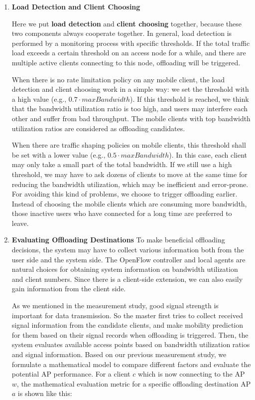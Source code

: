 \documentclass[english]{tktltiki}
\begin{document}
\begin{enumerate}
\item \textbf{Load Detection and Client Choosing}

Here we put \textbf{load detection} and \textbf{client choosing} together, because these two components always cooperate together. In general, load detection is performed by a monitoring process with specific thresholds. If the total traffic load exceeds a certain threshold on an access node for a while, and there are multiple active clients connecting to this node, offloading will be triggered. 

When there is no rate limitation policy on any mobile client, the load detection and client choosing work in a simple way: we set the threshold with a high value (e.g., $0.7 \cdot maxBandwidth$). If this threshold is reached, we think that the bandwidth utilization ratio is too high, and users may interfere each other and suffer from bad throughput. The mobile clients with top bandwidth utilization ratios are considered as offloading candidates.

When there are traffic shaping policies on mobile clients, this threshold shall be set with a lower value (e.g., $0.5 \cdot maxBandwidth$). In this case, each client may only take a small part of the total bandwidth. If we still use a high threshold, we may have to ask dozens of clients to move at the same time for reducing the bandwidth utilization, which may be inefficient and error-prone. For avoiding this kind of problems, we choose to trigger offloading earlier. Instead of choosing the mobile clients which are consuming more bandwidth, those inactive users who have connected for a long time are preferred to leave.

\item \textbf{Evaluating Offloading Destinations}
To make beneficial offloading decisions, the system may have to collect various information both from the user side and the system side. The OpenFlow controller and local agents are natural choices for obtaining system information on bandwidth utilization and client numbers. Since there is a client-side extension, we can also easily gain information from the client side.
  
As we mentioned in the measurement study, good signal strength is important for data transmission. So the master first tries to collect received signal information from the candidate clients, and make mobility prediction for them based on their signal records when offloading is triggered. Then, the system evaluates available access points based on bandwidth utilization ratios and signal information. Based on our previous measurement study, we formulate a mathematical model to compare different factors and evaluate the potential AP performance. For a client $c$ which is now connecting to the AP $w$, the mathematical evaluation metric for a specific offloading destination AP $a$ is shown like this:
  

\end{enumerate}
\end{document}
